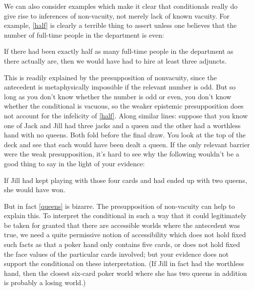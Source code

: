 \documentclass[If.tex]{subfiles}
\begin{document}
We can also consider examples which make it clear that conditionals really do give rise to inferences of non-vacuity, not merely lack of known vacuity.  For example, \ref{half} is clearly a terrible thing to assert unless one believes that the number of full-time people in the department is even:
\begin{prop}
	\nitem \label{half}
		If there had been exactly half as many full-time people in the department as there actually are, then we would have had to hire at least three adjuncts.
\end{prop}
This is readily explained by the presupposition of nonvacuity, since the antecedent is metaphysically impossible if the relevant number is odd. But so long as you don't know whether the number is odd or even, you don't know whether the conditional is vacuous, so the weaker epistemic presupposition does not account for the infelicity of \ref{half}. Along similar lines: suppose that you know one of Jack and Jill had three jacks and a queen and the other had a worthless hand with no queens. Both fold before the final draw.  You look at the top of the deck and see that each would have been dealt a queen. If the only relevant barrier were the weak presupposition, it's hard to see why the following wouldn't be a good thing to say in the light of your evidence:
\begin{prop}
	\nitem \label{queens}
		If Jill had kept playing with those four cards and had ended up with two queens, she would have won.
\end{prop}
But in fact \ref{queens} is bizarre. The presupposition of non-vacuity can help to explain this.  To interpret the conditional in such a way that it could legitimately be taken for granted that there are accessible worlds where the antecedent was true, we need a quite permissive notion of accessibility which does not hold fixed such facts as that a poker hand only contains five cards, or does not hold fixed the face values of the particular cards involved; but your evidence does not support the conditional on these interpretation.  (If Jill in fact had the worthless hand, then the closest six-card poker world where she has two queens in addition is probably a losing world.)

\end{document}
